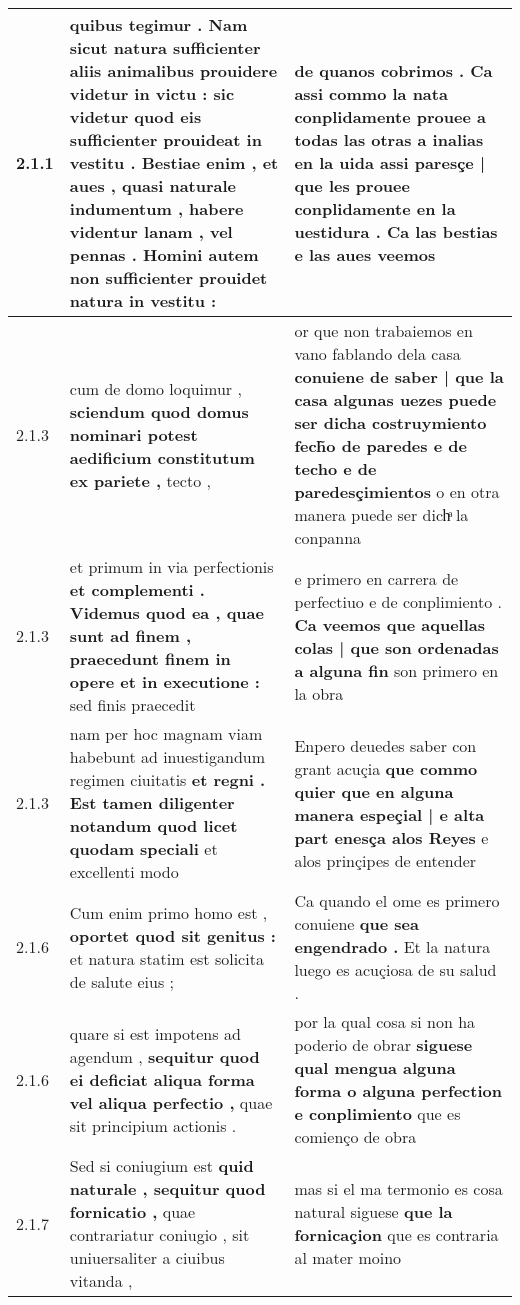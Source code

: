 \begin{tabular}{|p{1cm}|p{6.5cm}|p{6.5cm}|}
2.1.1 & quibus tegimur . \textbf{ Nam sicut natura sufficienter aliis animalibus prouidere videtur in victu : sic videtur quod eis sufficienter prouideat in vestitu . Bestiae enim , et aues , } quasi naturale indumentum , habere videntur lanam , vel pennas . Homini autem non sufficienter prouidet natura in vestitu : & de quanos cobrimos . \textbf{ Ca assi commo la nata conplidamente prouee a todas las otras a inalias en la uida assi paresçe | que les prouee conplidamente en la uestidura . } Ca las bestias e las aues veemos \\\hline
2.1.3 & cum de domo loquimur , \textbf{ sciendum quod domus nominari potest aedificium constitutum ex pariete , } tecto , & or que non trabaiemos en vano fablando dela casa \textbf{ conuiene de saber | que la casa algunas uezes puede ser dicha costruymiento fech̃o de paredes e de techo e de paredesçimientos } o en otra manera puede ser dichͣ la conpanna \\\hline
2.1.3 & et primum in via perfectionis \textbf{ et complementi . Videmus quod ea , quae sunt ad finem , praecedunt finem in opere et in executione : } sed finis praecedit & e primero en carrera de perfectiuo e de conplimiento . \textbf{ Ca veemos que aquellas colas | que son ordenadas a alguna fin } son primero en la obra \\\hline
2.1.3 & nam per hoc magnam viam habebunt ad inuestigandum regimen ciuitatis \textbf{ et regni . Est tamen diligenter notandum quod licet quodam speciali } et excellenti modo & Enpero deuedes saber con grant acuçia \textbf{ que commo quier que en alguna manera espeçial | e alta part enesça alos Reyes } e alos prinçipes de entender \\\hline
2.1.6 & Cum enim primo homo est , \textbf{ oportet quod sit genitus : } et natura statim est solicita de salute eius ; & Ca quando el ome es primero conuiene \textbf{ que sea engendrado . } Et la natura luego es acuçiosa de su salud . \\\hline
2.1.6 & quare si est impotens ad agendum , \textbf{ sequitur quod ei deficiat aliqua forma vel aliqua perfectio , } quae sit principium actionis . & por la qual cosa si non ha poderio de obrar \textbf{ siguese qual mengua alguna forma o alguna perfection e conplimiento } que es comienço de obra \\\hline
2.1.7 & Sed si coniugium est \textbf{ quid naturale , sequitur quod fornicatio , } quae contrariatur coniugio , sit uniuersaliter a ciuibus vitanda , & mas si el ma termonio es cosa natural siguese \textbf{ que la fornicaçion } que es contraria al mater moino \\\hline

\end{tabular}
